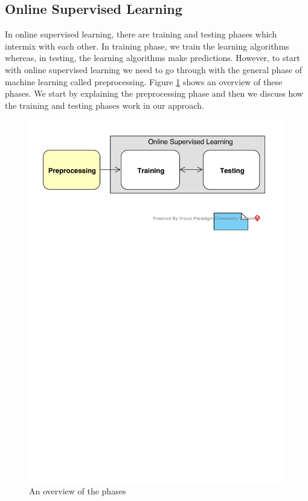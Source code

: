 \documentclass[a4paper,12pt]{article}
\begin{document}
\subsection{Online Supervised Learning}
In online supervised learning, there are training and testing phases which intermix with each other. In training phase, we train the learning algorithms whereas, in testing, the learning algorithms make predictions. However, to start with online supervised learning we need to go through with the general phase of machine learning called preprocessing. Figure \ref{OnlineSupervisedLearning} shows an overview of these phases. We start by explaining the preprocessing phase and then we discuss how the training and testing phases work in our approach.
\begin{figure}[H]
	\centering
	\includegraphics[keepaspectratio, width=\linewidth]{figures/OnlineSupervisedLearning.pdf}
	\caption{An overview of the phases}
	\label{OnlineSupervisedLearning}
\end{figure}
\end{document}
